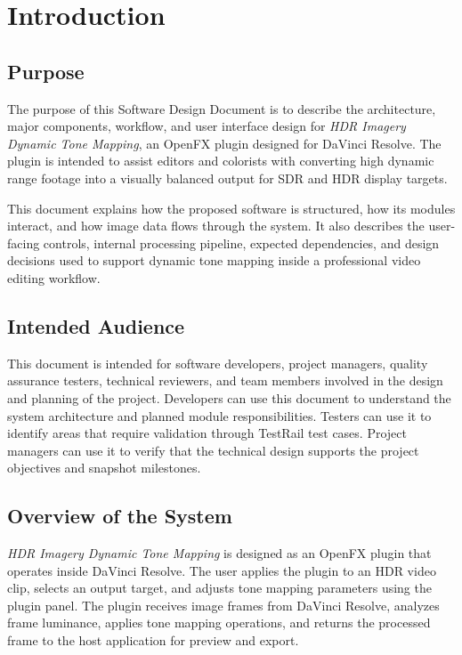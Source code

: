 \documentclass[12pt,hyphens]{article}
\begin{document}
\section{Introduction}

\subsection{Purpose}
The purpose of this Software Design Document is to describe the architecture, major components, workflow, and user interface design for \textit{HDR Imagery Dynamic Tone Mapping}, an OpenFX plugin designed for DaVinci Resolve. The plugin is intended to assist editors and colorists with converting high dynamic range footage into a visually balanced output for SDR and HDR display targets.

This document explains how the proposed software is structured, how its modules interact, and how image data flows through the system. It also describes the user-facing controls, internal processing pipeline, expected dependencies, and design decisions used to support dynamic tone mapping inside a professional video editing workflow.

\subsection{Intended Audience}
This document is intended for software developers, project managers, quality assurance testers, technical reviewers, and team members involved in the design and planning of the project. Developers can use this document to understand the system architecture and planned module responsibilities. Testers can use it to identify areas that require validation through TestRail test cases. Project managers can use it to verify that the technical design supports the project objectives and snapshot milestones.

\subsection{Overview of the System}
\textit{HDR Imagery Dynamic Tone Mapping} is designed as an OpenFX plugin that operates inside DaVinci Resolve. The user applies the plugin to an HDR video clip, selects an output target, and adjusts tone mapping parameters using the plugin panel. The plugin receives image frames from DaVinci Resolve, analyzes frame luminance, applies tone mapping operations, and returns the processed frame to the host application for preview and export.
\end{document}
